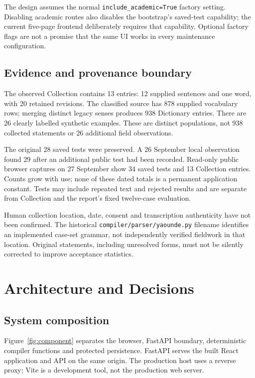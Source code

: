 \documentclass[11pt,a4paper]{article}
\begin{document}
The design assumes the normal \texttt{include\_academic=True} factory setting.
Disabling academic routes also disables the bootstrap's saved-test capability;
the current five-page frontend deliberately requires that capability. Optional
factory flags are not a promise that the same UI works in every maintenance
configuration.

\subsection{Evidence and provenance boundary}
The observed Collection contains 13 entries: 12 supplied sentences and one
word, with 20 retained revisions. The classified source has 878 supplied
vocabulary rows; merging distinct legacy senses produces 938 Dictionary
entries. There are 26 clearly labelled synthetic examples. These are distinct
populations, not 938 collected statements or 26 additional field observations.

The original 28 saved tests were preserved. A 26 September local observation
found 29 after an additional public test had been recorded. Read-only public
browser captures on 27 September show 34 saved tests and 13 Collection entries.
Counts grow with use; none of these dated totals is a permanent application
constant. Tests may include repeated text and rejected results and are separate
from Collection and the report's fixed twelve-case evaluation.

Human collection location, date, consent and transcription authenticity have
not been confirmed. The historical \nolinkurl{compiler/parser/yaounde.py}
filename identifies an implemented case-set grammar, not independently verified
fieldwork in that location. Original statements, including unresolved forms,
must not be silently corrected to improve acceptance statistics.

\section{Architecture and Decisions}
\subsection{System composition}
Figure~\ref{fig:component} separates the browser, FastAPI boundary, deterministic
compiler functions and protected persistence. FastAPI serves the built React
application and API on the same origin. The production host uses a reverse
proxy; Vite is a development tool, not the production web server.
\end{document}
